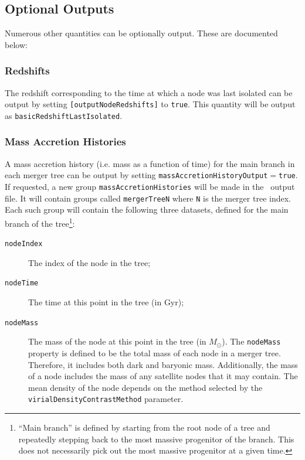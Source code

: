 \subsection{Optional Outputs}

Numerous other quantities can be optionally output. These are documented below:

\subsubsection{Redshifts}

The redshift corresponding to the time at which a node was last isolated can be output by setting {\tt [outputNodeRedshifts]} to {\tt true}. This quantity will be output as {\tt basicRedshiftLastIsolated}.

\subsubsection{Mass Accretion Histories}

A mass accretion history (i.e. mass as a function of time) for the main branch in each merger tree can be output by setting {\tt massAccretionHistoryOutput}$=${\tt true}. If requested, a new group {\tt massAccretionHistories} will be made in the \glc\ output file. It will contain groups called {\tt mergerTreeN} where {\tt N} is the merger tree index. Each such group will contain the following three datasets, defined for the main branch of the tree\footnote{``Main branch'' is defined by starting from the root node of a tree and repeatedly stepping back to the most massive progenitor of the branch. This does not necessarily pick out the most massive progenitor at a given time.}:
\begin{description}
 \item [{\tt nodeIndex}] The index of the node in the tree;
 \item [{\tt nodeTime}] The time at this point in the tree (in Gyr);
 \item [{\tt nodeMass}] The mass of the node at this point in the tree (in $M_\odot$). The {\tt nodeMass} property is defined to be the total mass of each node in a merger tree. Therefore, it includes both dark and baryonic mass. Additionally, the mass of a node includes the mass of any satellite nodes that it may contain. The mean density of the node depends on the method selected by the {\tt virialDensityContrastMethod} parameter.
\end{description}

